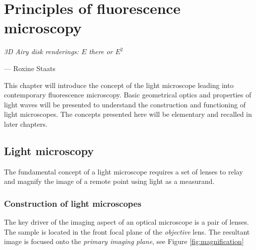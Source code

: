

\chapter{Principles of fluorescence microscopy}
\epigraph{\emph{3D Airy disk renderings: $E$ there or $E^2$}}{--- Roxine Staats}

This chapter will introduce the concept of the light microscope leading into contemporary fluorescence microscopy.
Basic geometrical optics and properties of light waves will be presented to understand the construction and functioning of light microscopes.
The concepts presented here will be elementary and recalled in later chapters.

\section{Light microscopy}

The fundamental concept of a light microscope requires a set of lenses to relay and magnify the image of a remote point using light as a measurand.

\subsection{Construction of light microscopes}

The key driver of the imaging aspect of an optical microscope is a pair of lenses.
The sample is located in the front focal plane of the \emph{objective} lens.
The resultant image is focused onto the \emph{primary imaging plane}, see Figure \ref{fig:magnification}

